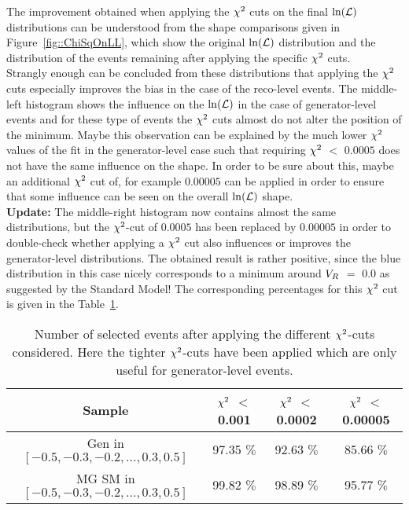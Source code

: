 The improvement obtained when applying the $\chi^{2}$ cuts on the final $\ln(\mathcal{L})$ distributions can be understood from the shape comparisons given in Figure~\ref{fig::ChiSqOnLL}, which show the original $\ln(\mathcal{L})$ distribution and the distribution of the events remaining after applying the specific $\chi^{2}$ cuts.\\
Strangly enough can be concluded from these distributions that applying the $\chi^{2}$ cuts especially improves the bias in the case of the reco-level events. The middle-left histogram shows the influence on the $\ln(\mathcal{L})$ in the case of generator-level events and for these type of events the $\chi^{2}$ cuts almost do not alter the position of the minimum. Maybe this observation can be explained by the much lower $\chi^{2}$ values of the fit in the generator-level case such that requiring $\chi^{2}$ $<$ $0.0005$ does not have the same influence on the shape. In order to be sure about this, maybe an additional $\chi^{2}$ cut of, for example $0.00005$ can be applied in order to ensure that some influence can be seen on the overall $\ln(\mathcal{L})$ shape.\\
\textbf{Update: } The middle-right histogram now contains almost the same distributions, but the $\chi^{2}$-cut of $0.0005$ has been replaced by $0.00005$ in order to double-check whether applying a $\chi^{2}$ cut also influences or improves the generator-level distributions. The obtained result is rather positive, since the blue distribution in this case nicely corresponds to a minimum around $V_{R}$ $=$ $0.0$ as suggested by the Standard Model! The corresponding percentages for this $\chi^{2}$ cut is given in the Table~\ref{table::ChiSqCutTight}.
\begin{table}[h!t]
 \centering
 \caption{Number of selected events after applying the different $\chi^{2}$-cuts considered. Here the tighter $\chi^{2}$-cuts have been applied which are only useful for generator-level events.} 
 \label{table::ChiSqCutTight}
 \begin{tabular}{c|c|c|c}
  Sample 							& $\chi^{2}$ $<$ 0.001 	& $\chi^{2}$ $<$ 0.0002 	& $\chi^{2}$ $<$ 0.00005 	\\
  \hline
  Gen in $\left[-0.5, -0.3, -0.2, ..., 0.3, 0.5 \right]$ 	& 97.35 $\%$		& 92.63 $\%$		& 85.66 $\%$		\\
  MG SM in $\left[-0.5, -0.3, -0.2, ..., 0.3, 0.5 \right]$ 	& 99.82 $\%$		& 98.89 $\%$		& 95.77 $\%$		
 \end{tabular}
\end{table}

